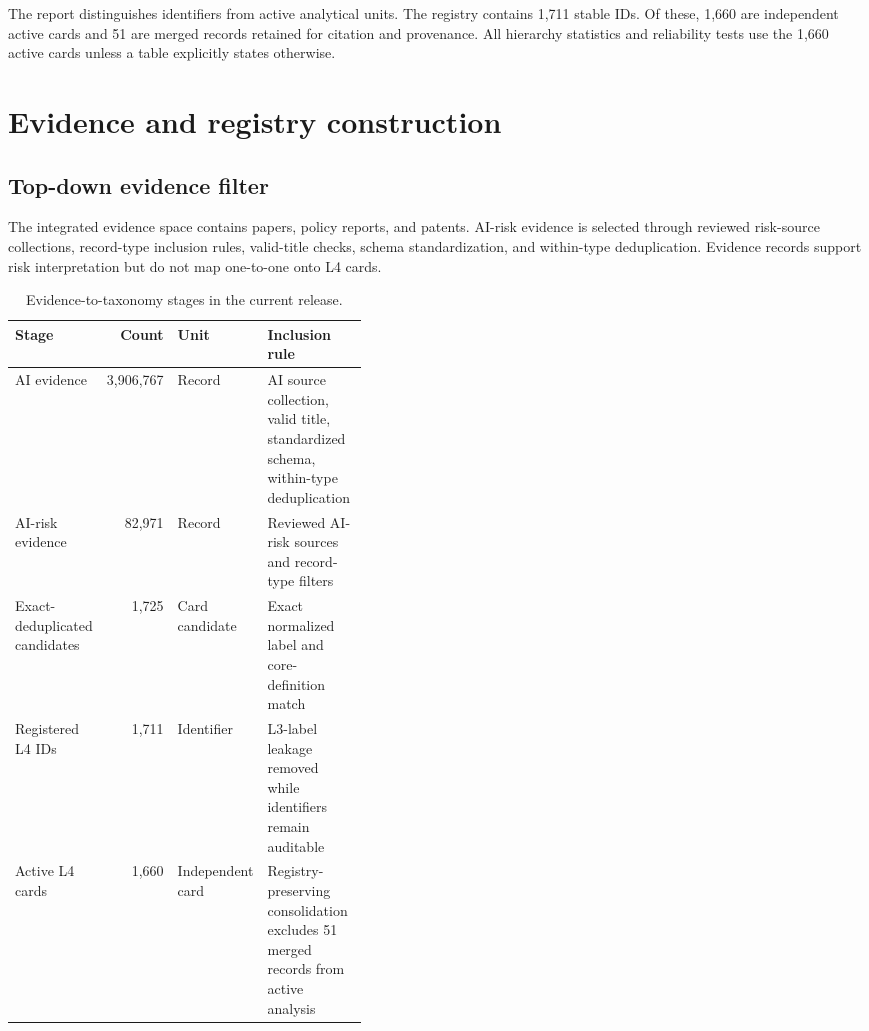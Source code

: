 \documentclass[11pt,a4paper]{article}
\begin{document}
The report distinguishes identifiers from active analytical units. The
registry contains 1,711 stable IDs. Of these, 1,660 are independent active
cards and 51 are merged records retained for citation and provenance. All
hierarchy statistics and reliability tests use the 1,660 active cards unless a
table explicitly states otherwise.

\section{Evidence and registry construction}

\subsection{Top-down evidence filter}

The integrated evidence space contains papers, policy reports, and patents.
AI-risk evidence is selected through reviewed risk-source collections,
record-type inclusion rules, valid-title checks, schema standardization, and
within-type deduplication. Evidence records support risk interpretation but do
not map one-to-one onto L4 cards.

\begin{table}[H]
\centering
\caption{Evidence-to-taxonomy stages in the current release.}
\label{tab:funnel}
\small
\begin{tabularx}{\linewidth}{L{0.23\linewidth}r L{0.18\linewidth}Y}
\toprule
Stage & Count & Unit & Inclusion rule \\
\midrule
AI evidence & 3,906,767 & Record & AI source collection, valid title, standardized schema, within-type deduplication \\
AI-risk evidence & 82,971 & Record & Reviewed AI-risk sources and record-type filters \\
Exact-deduplicated candidates & 1,725 & Card candidate & Exact normalized label and core-definition match \\
Registered L4 IDs & 1,711 & Identifier & L3-label leakage removed while identifiers remain auditable \\
Active L4 cards & 1,660 & Independent card & Registry-preserving consolidation excludes 51 merged records from active analysis \\
\bottomrule
\end{tabularx}
\end{table}
\end{document}
